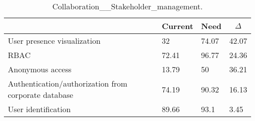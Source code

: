 
  \begin{table*}[]
  \centering
  \notsotiny
  \caption{ Collaboration__Stakeholder_management.}
\label{tab:collaboration__stakeholder_management}
\begin{tabular}{|l|l|l|l|}
  \hline
  \rowcolor[HTML]{C0C0C0}
    \multicolumn{1}{|c|}{Feature} & \multicolumn{1}{c|}{Current} & \multicolumn{1}{c|}{Need} & \multicolumn{1}{c|}{$\Delta$} \\ \hline
  User presence visualization & 32 & 74.07 & 42.07 \\ \hline 
RBAC & 72.41 & 96.77 & 24.36 \\ \hline 
Anonymous access & 13.79 & 50 & 36.21 \\ \hline 
Authentication/authorization from corporate database & 74.19 & 90.32 & 16.13 \\ \hline 
User identification & 89.66 & 93.1 & 3.45 \\ \hline 
\end{tabular}%
  \end{table*}